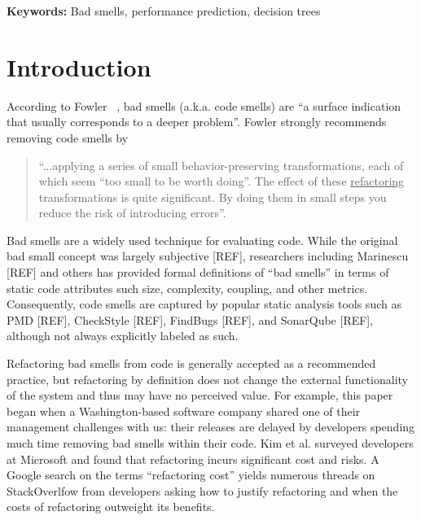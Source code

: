 \documentclass[twocolumn,5p]{elsarticle}
\theoremstyle{break}
\begin{document}

\vspace{1mm}
\noindent
{\bf Keywords:} Bad smells,
performance prediction,  decision trees 




\section{Introduction}

According to   Fowler ~\cite{fowler99}, bad smells (a.k.a. code smells)
are ``a surface indication that usually corresponds to a deeper problem''.
Fowler strongly recommends   removing   code smells   by
\begin{quote}
``...applying a series of small behavior-preserving transformations, each 
of which seem ``too small to be worth doing''. 
The  effect of   these \underline{refactoring} transformations is quite significant. By doing them in small steps you reduce the risk 
of introducing errors''.
\end{quote}

Bad smells are a widely used technique for evaluating code. While the original bad small concept was largely subjective [REF], researchers including Marinescu [REF] and others has provided formal definitions of ``bad smells'' in terms of static code attributes such size, complexity, coupling, and other metrics. Consequently, code smells are captured by popular static analysis tools such as PMD [REF], CheckStyle [REF], FindBugs [REF], and SonarQube [REF], although not always explicitly labeled as such. 

Refactoring bad smells from code is generally accepted as a recommended practice, but refactoring by definition does not change the external functionality of the system and thus may have no perceived value. For example, this paper began when a Washington-based software company shared one of their management challenges with us: their  releases are delayed by developers spending  much time removing bad smells within their code. 
Kim et al.\cite{kim2012field} surveyed developers at Microsoft and found that refactoring incurs significant cost and risks. A Google search on the terms ``refactoring cost'' yields numerous threads on StackOverlfow from developers asking how to justify refactoring and when the costs of refactoring outweight its benefits. 


\end{document}

